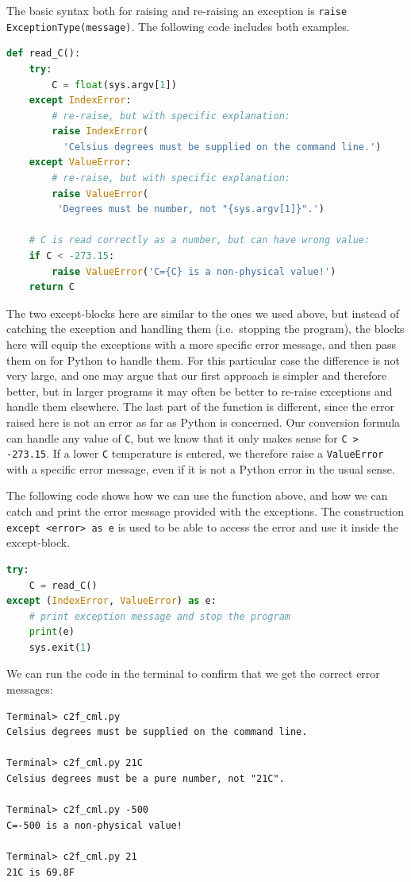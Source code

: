\documentclass[graybox,envcountchap,sectrefs,final]{svmonodo}
\begin{document}
\noindent
The basic syntax both for raising and re-raising an exception is \texttt{raise ExceptionType(message)}. The following code
includes both examples.
\begin{lstlisting}[language=Python,style=blue1]
def read_C():
    try:
        C = float(sys.argv[1])
    except IndexError:
        # re-raise, but with specific explanation:
        raise IndexError(
          'Celsius degrees must be supplied on the command line.')
    except ValueError:
        # re-raise, but with specific explanation:
        raise ValueError(
         'Degrees must be number, not "{sys.argv[1]}".')

    # C is read correctly as a number, but can have wrong value:
    if C < -273.15:
        raise ValueError('C={C} is a non-physical value!')
    return C
\end{lstlisting}
The two except-blocks here are similar to the ones we used above, but instead of catching the exception and
handling them (i.e.~stopping the program), the blocks here will equip the exceptions with a more specific error message, and
then pass them on for Python to handle them. For this particular case the difference is not very large, and one may argue
that our first approach is simpler and therefore better, but in larger programs it may often be better to re-raise
exceptions and handle them elsewhere. The last part of the function is different, since the error raised here is not
an error as far as Python is concerned. Our conversion formula can handle any value of \texttt{C}, but we know that
it only makes sense for \texttt{C > -273.15}. If a lower \texttt{C} temperature is entered, we therefore raise a \texttt{ValueError}
with a specific error message, even if it is not a Python error in the usual sense.

The following code shows how we can use the function above, and how we can catch and print the error message
provided with the exceptions. The construction \texttt{except <error> as e} is used to be able to access the error and use
it inside the except-block.
\begin{lstlisting}[language=Python,style=blue1]
try:
    C = read_C()
except (IndexError, ValueError) as e:
    # print exception message and stop the program
    print(e)
    sys.exit(1)
\end{lstlisting}
We can run the code in the terminal to confirm that we get the correct error messages:
\begin{Verbatim}[frame=lines,label=\fbox{{\tiny Terminal}},framesep=2.5mm,framerule=0.7pt]
Terminal> c2f_cml.py
Celsius degrees must be supplied on the command line.

Terminal> c2f_cml.py 21C
Celsius degrees must be a pure number, not "21C".

Terminal> c2f_cml.py -500
C=-500 is a non-physical value!

Terminal> c2f_cml.py 21
21C is 69.8F
\end{Verbatim}
\end{document}
